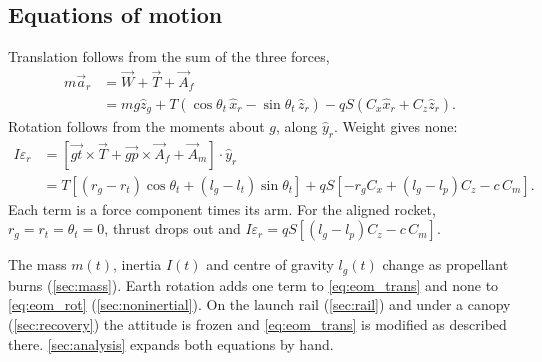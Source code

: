 \subsection{Equations of motion}\label{sec:eom}
Translation follows from the sum of the three forces,
\begin{align}
    m\vec{a}_r &= \vec{W} + \vec{T} + \vec{A}_f \label{eq:eom_trans}\\
               &= mg\hat{z}_g + T\left(\cos\theta_t\,\hat{x}_r - \sin\theta_t\,\hat{z}_r\right)
                  - qS\left(C_x\hat{x}_r + C_z\hat{z}_r\right). \label{eq:eom_trans_expanded}
\end{align}
Rotation follows from the moments about $g$, along $\hat{y}_r$. Weight gives none:
\begin{align}
    I\varepsilon_r &= \left[\vec{gt}\times\vec{T} + \vec{gp}\times\vec{A}_f
                       + \vec{A}_m\right]\cdot\hat{y}_r \label{eq:eom_rot}\\
                   &= T\left[(r_g-r_t)\cos\theta_t + (l_g-l_t)\sin\theta_t\right]
                      + qS\left[-r_gC_x + (l_g-l_p)C_z - c\,C_m\right]. \label{eq:eom_rot_expanded}
\end{align}
Each term is a force component times its arm. For the aligned rocket, $r_g=r_t=\theta_t=0$,
thrust drops out and $I\varepsilon_r=qS\left[(l_g-l_p)C_z-c\,C_m\right]$.

The mass $m(t)$, inertia $I(t)$ and centre of gravity $l_g(t)$ change as propellant burns
(\autoref{sec:mass}). Earth rotation adds one term to \autoref{eq:eom_trans} and none to
\autoref{eq:eom_rot} (\autoref{sec:noninertial}). On the launch rail (\autoref{sec:rail}) and
under a canopy (\autoref{sec:recovery}) the attitude is frozen and \autoref{eq:eom_trans} is
modified as described there. \autoref{sec:analysis} expands both equations by hand.
